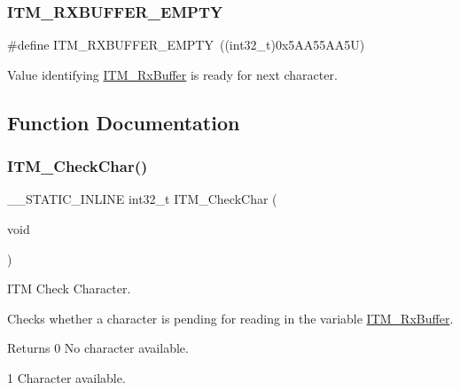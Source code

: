 \subsubsection{\texorpdfstring{ITM\_RXBUFFER\_EMPTY}{ITM\_RXBUFFER\_EMPTY}\hspace{0.1cm}{\footnotesize\ttfamily [6/6]}}
{\footnotesize\ttfamily \#define I\+T\+M\+\_\+\+R\+X\+B\+U\+F\+F\+E\+R\+\_\+\+E\+M\+P\+TY~((int32\+\_\+t)0x5\+A\+A55\+A\+A5\+U)}

Value identifying \mbox{\hyperlink{group___c_m_s_i_s__core___debug_functions_ga12e68e55a7badc271b948d6c7230b2a8}{I\+T\+M\+\_\+\+Rx\+Buffer}} is ready for next character. 

\subsection{Function Documentation}
\mbox{\label{group___c_m_s_i_s__core___debug_functions_gae61ce9ca5917735325cd93b0fb21dd29}} 
\subsubsection{\texorpdfstring{ITM\_CheckChar()}{ITM\_CheckChar()}}
{\footnotesize\ttfamily \+\_\+\+\_\+\+S\+T\+A\+T\+I\+C\+\_\+\+I\+N\+L\+I\+NE int32\+\_\+t I\+T\+M\+\_\+\+Check\+Char (\begin{DoxyParamCaption}\item[{void}]{ }\end{DoxyParamCaption})}



I\+TM Check Character. 

Checks whether a character is pending for reading in the variable \mbox{\hyperlink{group___c_m_s_i_s__core___debug_functions_ga12e68e55a7badc271b948d6c7230b2a8}{I\+T\+M\+\_\+\+Rx\+Buffer}}. \begin{DoxyReturn}{Returns}
0 No character available. 

1 Character available. 
\end{DoxyReturn}
\mbox{\label{group___c_m_s_i_s__core___debug_functions_gac3ee2c30a1ac4ed34c8a866a17decd53}} 
